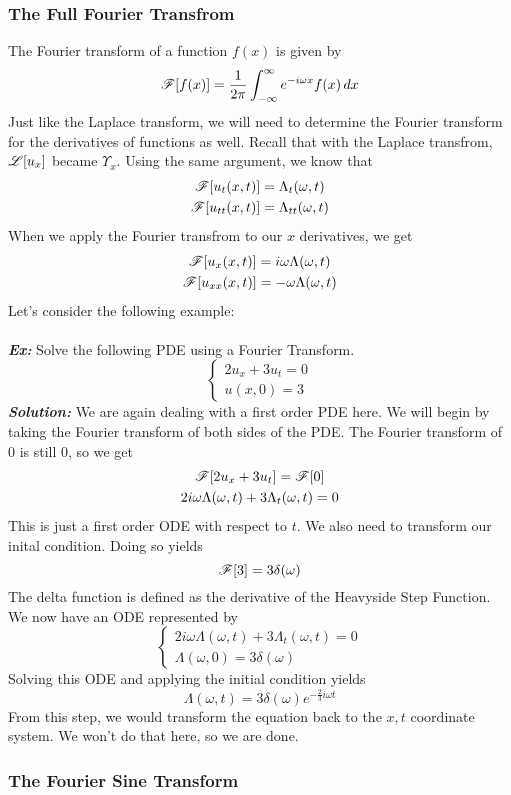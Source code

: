 \subsubsection{The Full Fourier Transfrom}
The Fourier transform of a function $f(x)$ is given by
\[
\mathscr{F}[f(x)] = \frac{1}{2\pi}\int_{-\infty}^{\infty}e^{-i\omega x}f(x)\mathop{dx}
\]
Just like the Laplace transform, we will need to determine the Fourier transform for the derivatives
of functions as well. Recall that with the Laplace transfrom, $\mathscr{L}[u_{x}]$ became $\Upsilon_{x}$.
Using the same argument, we know that
\begin{gather*}
\mathscr{F}[u_{t}(x,t)] = \Lambda_{t}(\omega,t)\\
\mathscr{F}[u_{tt}(x,t)] = \Lambda_{tt}(\omega,t)
\end{gather*}
When we apply the Fourier transfrom to our $x$ derivatives, we get
\begin{gather*}
\mathscr{F}[u_{x}(x,t)] = i\omega\Lambda(\omega,t)\\
\mathscr{F}[u_{xx}(x,t)] = -\omega\Lambda(\omega,t)
\end{gather*}
Let's consider the following example:\\\\
\noindent \textbf{\textit{Ex:}} Solve the following PDE using a Fourier Transform.
\[
\begin{cases*}
2u_{x} + 3u_{t} = 0\\
u(x,0) = 3
\end{cases*}
\]
\indent \textbf{\textit{Solution:}} We are again dealing with a first order PDE here. We will
begin by taking the Fourier transform of both sides of the PDE. The Fourier transform of 0 is
still 0, so we get
\begin{gather*}
\mathscr{F}[2u_{x} + 3u_{t}] = \mathscr{F}[0]\\
2i\omega\Lambda(\omega,t) + 3\Lambda_{t}(\omega,t) = 0
\end{gather*}
This is just a first order ODE with respect to $t$. We also need to transform our inital condition.
Doing so yields
\[
\mathscr{F}[3] = 3\delta(\omega)
\]
The delta function is defined as the derivative of the Heavyside Step Function. We now have an
ODE represented by
\[
\begin{cases*}
2i\omega\Lambda(\omega,t) + 3\Lambda_{t}(\omega,t) = 0\\
\Lambda(\omega,0) = 3\delta(\omega)
\end{cases*}
\]
Solving this ODE and applying the initial condition yields
\[
\Lambda(\omega,t) = 3\delta(\omega)e^{-\frac{2}{3}i\omega t}
\]
From this step, we would transform the equation back to the $x,t$ coordinate system. We won't do that
here, so we are done.
\newpage

\subsubsection{The Fourier Sine Transform}
